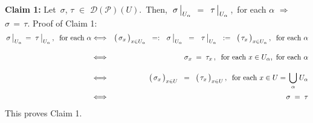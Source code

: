 \vskip 0.5cm
\noindent
\textbf{Claim 1:}\quad
Let \,$\sigma$, $\tau$ $\in$ $\mathscr{D}(\mathscr{P})(U)$.
\,\;Then,
\,$\left.\overset{{\color{white}.}}{\sigma}\,\right\vert_{U_{\alpha}}$
$=$
$\left.\overset{{\color{white}.}}{\tau}\,\right\vert_{U_{\alpha}}$\,,\,
for each $\alpha$
\;\;$\Longrightarrow$\;\;
$\sigma \,=\, \tau$.
\vskip 0.2cm
\noindent
Proof of Claim 1:
\begin{eqnarray*}
	\left.\overset{{\color{white}.}}{\sigma}\,\right\vert_{U_{\alpha}}
	\, = \,
	\left.\overset{{\color{white}.}}{\tau}\,\right\vert_{U_{\alpha}},
	\;\;\textnormal{for each $\alpha$}
& \Longleftrightarrow &
	\left(\,\overset{{\color{white}.}}{\sigma_{x}}\,\right)_{x \in U_{\alpha}}
	\;\; =: \;\;
	\left.\overset{{\color{white}.}}{\sigma}\,\right\vert_{U_{\alpha}}
	\;\; = \;\;
	\left.\overset{{\color{white}.}}{\tau}\,\right\vert_{U_{\alpha}}
	\;\; := \;\;
	\left(\,\overset{{\color{white}.}}{\tau_{x}}\,\right)_{x \in U_{\alpha}},
	\;\;\textnormal{for each $\alpha$}
\\
& \overset{{\color{white}\textnormal{\LARGE$1$}}}{\Longleftrightarrow} &
	\sigma_{x} \; = \; \tau_{x}\,,
	\;\;\textnormal{for each $x \in U_{\alpha}$,\, for each $\alpha$}
\\
& \overset{{\color{white}\textnormal{\LARGE$1$}}}{\Longleftrightarrow} &
	\left(\,\overset{{\color{white}.}}{\sigma_{x}}\,\right)_{x \in U}
	\;\; = \;\;
	\left(\,\overset{{\color{white}.}}{\tau_{x}}\,\right)_{x \in U},
	\;\;\textnormal{for each $x \in U = \,\underset{\alpha}{\bigcup}\;U_{\alpha}$}
\\
& \overset{{\color{white}\textnormal{\tiny$1$}}}{\Longleftrightarrow} &
	\sigma \; = \; \tau
\end{eqnarray*}
This proves Claim 1.

